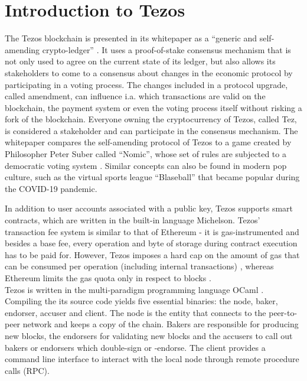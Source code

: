 \section{Introduction to Tezos}\label{sec:tezos}
The Tezos blockchain is presented in its whitepaper as a \enquote{generic and self-amending crypto-ledger} \cite{goodman_tezos_2014}. It uses a proof-of-stake consensus mechanism that is not only used to agree on the current state of its ledger, but also allows its stakeholders to come to a consensus about changes in the economic protocol by participating in a voting process. The changes included in a protocol upgrade, called amendment, can influence i.a. which transactions are valid on the blockchain, the payment system or even the voting process itself without risking a fork of the blockchain. Everyone owning the cryptocurrency of Tezos, called Tez, is considered a stakeholder and can participate in the consensus mechanism. The whitepaper compares the self-amending protocol of Tezos to a game created by Philosopher Peter Suber called ``Nomic'', whose set of rules are subjected to a democratic voting system \cite{nomic}. Similar concepts can also be found in modern pop culture, such as the virtual sports league ``Blaseball'' \cite{blaseball} that became popular during the COVID-19 pandemic.

In addition to user accounts associated with a public key, Tezos supports smart contracts, which are written in the built-in language Michelson. Tezos' transaction fee system is similar to that of Ethereum \cite{wood_ethereum_2021} - it is gas-instrumented and besides a base fee, every operation and byte of storage during contract execution has to be paid for. However, Tezos imposes a hard cap on the amount of gas that can be consumed per operation (including internal transactions) \cite{tezos_docs}\cite{morley_repo}, whereas Ethereum limits the gas quota only in respect to blocks \cite{wood_ethereum_2021}.\\
Tezos is written in the multi-paradigm programming language OCaml \cite{ocaml_doc}. Compiling the its source code yields five essential binaries: the node, baker, endorser, accuser and client. The node is the entity that connects to the peer-to-peer network and keeps a copy of the chain. Bakers are responsible for producing new blocks, the endorsers for validating new blocks and the accusers to call out bakers or endorsers which double-sign or -endorse. The client provides a command line interface to interact with the local node through remote procedure calls (RPC).

